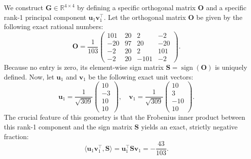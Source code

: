 We construct $\mathbf{G} \in \mathbb{R}^{4 \times 4}$ by defining a specific orthogonal matrix $\mathbf{O}$ and a specific rank-1 principal component $\mathbf{u}_1 \mathbf{v}_1^\top$. Let the orthogonal matrix $\mathbf{O}$ be given by the following exact rational numbers:
\begin{equation}
\mathbf{O} = \frac{1}{103} \begin{pmatrix} 101 & 20 & 2 & -2 \\ -20 & 97 & 20 & -20 \\ -2 & 20 & 2 & 101 \\ -2 & 20 & -101 & -2 \end{pmatrix}.
\end{equation}
Because no entry is zero, its element-wise sign matrix $\mathbf{S} = \operatorname{sign}(\mathbf{O})$ is uniquely defined. Now, let $\mathbf{u}_1$ and $\mathbf{v}_1$ be the following exact unit vectors:
\begin{equation}
\mathbf{u}_1 = \frac{1}{\sqrt{309}} \begin{pmatrix} 10 \\ -3 \\ 10 \\ 10 \end{pmatrix}, \quad \mathbf{v}_1 = \frac{1}{\sqrt{309}} \begin{pmatrix} 10 \\ 3 \\ -10 \\ 10 \end{pmatrix}.
\end{equation}
 The crucial feature of this geometry is that the Frobenius inner product between this rank-1 component and the sign matrix $\mathbf{S}$ yields an exact, strictly negative fraction:
\begin{equation}
\langle \mathbf{u}_1 \mathbf{v}_1^\top, \mathbf{S} \rangle = \mathbf{u}_1^\top \mathbf{S} \mathbf{v}_1 = -\frac{43}{103}.
\end{equation}

